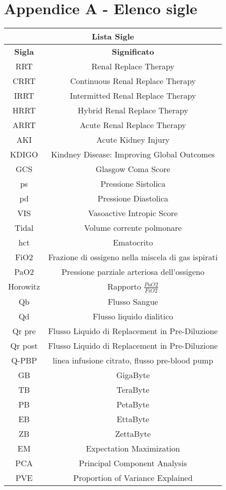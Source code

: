 \chapter{Appendice A - Elenco sigle }




\begin{longtable}{ | c | c | } 
		\hline
		\hline
		\multicolumn{2}{|c|}{\textbf{Lista Sigle}} \\
		\hline
		\hline
		\hline
		\textbf{Sigla} & \textbf{Significato}  \\
		\hline
		\hline
		RRT & Renal Replace Therapy\\
		\hline
		CRRT & Continuous Renal Replace Therapy\\
		\hline
		IRRT & Intermitted Renal Replace Therapy\\
		\hline
		HRRT & Hybrid Renal Replace Therapy\\
		\hline
		ARRT & Acute Renal Replace Therapy\\
		\hline
		AKI & Acute Kidney Injury\\
		\hline
		KDIGO & Kindney Disease: Improving Global Outcomes\\
		\hline
		GCS & Glasgow Coma Score\\
		\hline
		ps & Pressione Sistolica\\
		\hline
		pd & Pressione Diastolica\\
		\hline
		VIS & Vasoactive Intropic Score\\
		\hline
		Tidal & Volume corrente polmonare\\
		\hline
		hct & Ematocrito\\
		\hline
		FiO2 & Frazione di ossigeno nella miscela di gas ispirati\\
		\hline
		PaO2 & Pressione parziale arteriosa dell'ossigeno\\
		\hline
		Horowitz & Rapporto $ \frac{PaO2}{FiO2} $\\
		\hline
		Qb & Flusso Sangue\\
		\hline
		Qd & Flusso liquido dialitico\\
		\hline
		Qr pre & Flusso Liquido di Replacement in Pre-Diluzione\\
		\hline
		 Qr post & Flusso Liquido di Replacement in Pre-Diluzione\\
		 \hline
		 Q-PBP & linea infusione citrato, flusso pre-blood pump\\
		 \hline
		GB & GigaByte\\
		\hline
		TB & TeraByte\\
		\hline
		PB & PetaByte\\
		\hline
		EB & EttaByte\\
		\hline
		ZB &  ZettaByte\\
		\hline
		EM & Expectation Maximization\\
		\hline
		PCA &  Principal Component Analysis\\
		\hline
		PVE & Proportion of Variance Explained \\
		\hline
				 	
\end{longtable}
